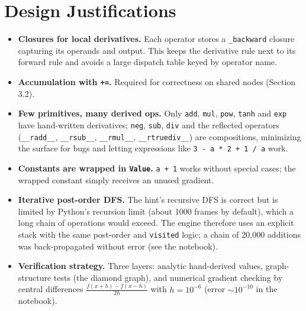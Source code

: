 \documentclass[11pt,a4paper]{article}
\begin{document}
\section{Design Justifications}
\begin{itemize}
\item \textbf{Closures for local derivatives.} Each operator stores a \texttt{\_backward} closure capturing its operands and output. This keeps the derivative rule next to its forward rule and avoids a large dispatch table keyed by operator name.
\item \textbf{Accumulation with \texttt{+=}.} Required for correctness on shared nodes (Section 3.2).
\item \textbf{Few primitives, many derived ops.} Only \texttt{add}, \texttt{mul}, \texttt{pow}, \texttt{tanh} and \texttt{exp} have hand-written derivatives; \texttt{neg}, \texttt{sub}, \texttt{div} and the reflected operators (\texttt{\_\_radd\_\_}, \texttt{\_\_rsub\_\_}, \texttt{\_\_rmul\_\_}, \texttt{\_\_rtruediv\_\_}) are compositions, minimizing the surface for bugs and letting expressions like \texttt{3 - a * 2 + 1 / a} work.
\item \textbf{Constants are wrapped in \texttt{Value}.} \texttt{a + 1} works without special cases; the wrapped constant simply receives an unused gradient.
\item \textbf{Iterative post-order DFS.} The hint's recursive DFS is correct but is limited by Python's recursion limit (about 1000 frames by default), which a long chain of operations would exceed. The engine therefore uses an explicit stack with the same post-order and \texttt{visited} logic; a chain of 20{,}000 additions was back-propagated without error (see the notebook).
\item \textbf{Verification strategy.} Three layers: analytic hand-derived values, graph-structure tests (the diamond graph), and numerical gradient checking by central differences $\frac{f(x+h)-f(x-h)}{2h}$ with $h=10^{-6}$ (error $\sim10^{-10}$ in the notebook).
\end{itemize}
\end{document}
